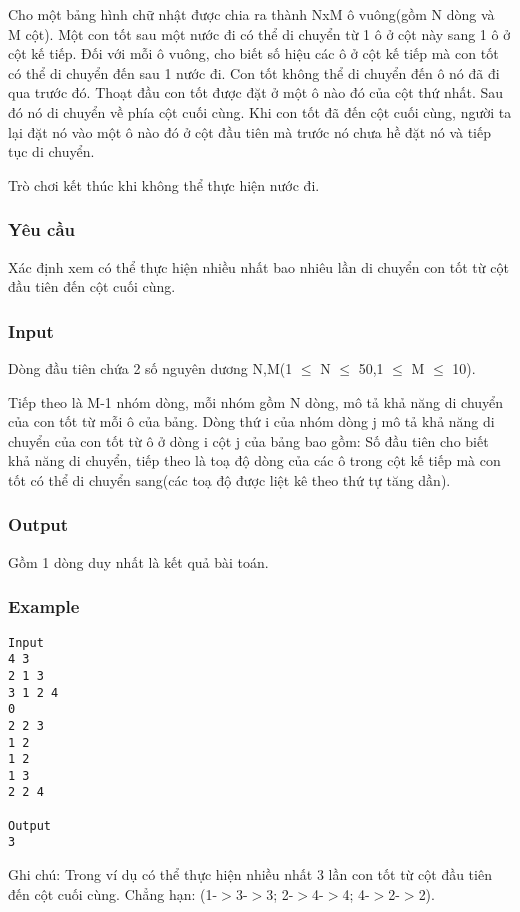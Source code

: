 



   Cho một bảng hình chữ nhật được chia ra thành NxM ô vuông(gồm N dòng và M cột). Một con tốt sau một nước đi có thể di chuyển từ 1 ô ở cột này sang 1 ô ở cột kế tiếp. Đối với mỗi ô vuông, cho biết số hiệu các ô ở cột kế tiếp mà con tốt có thể di chuyển đến sau 1 nước đi. Con tốt không thể di chuyển đến ô nó đã đi qua trước đó. Thoạt đầu con tốt được đặt ở một ô nào đó của cột thứ nhất. Sau đó nó di chuyển về phía cột cuối cùng. Khi con tốt đã đến cột cuối cùng, người ta lại đặt nó vào một ô nào đó ở cột đầu tiên mà trước nó chưa hề đặt nó và tiếp tục di chuyển.  

   Trò chơi kết thúc khi không thể thực hiện nước đi.  

\subsubsection{   Yêu cầu  }

   Xác định xem có thể thực hiện nhiều nhất bao nhiêu lần di chuyển con tốt từ cột đầu tiên đến cột cuối cùng.  

\subsubsection{   Input  }

   Dòng đầu tiên chứa 2 số nguyên dương N,M(1 $\le$ N $\le$ 50,1 $\le$ M $\le$ 10).  

   Tiếp theo là M-1 nhóm dòng, mỗi nhóm gồm N dòng, mô tả khả năng di chuyển của con tốt từ mỗi ô của bảng. Dòng thứ i của nhóm dòng j mô tả khả năng di chuyển của con tốt từ ô ở dòng i cột j của bảng bao gồm: Số đầu tiên cho biết khả năng di chuyển, tiếp theo là toạ độ dòng của các ô trong cột kế tiếp mà con tốt có thể di chuyển sang(các toạ độ được liệt kê theo thứ tự tăng dần).  

\subsubsection{   Output  }

   Gồm 1 dòng duy nhất là kết quả bài toán.  

\subsubsection{   Example  }
\begin{verbatim}
Input
4 3 
2 1 3 
3 1 2 4
0
2 2 3 
1 2 
1 2 
1 3 
2 2 4 

Output
3
\end{verbatim}

   Ghi chú: Trong ví dụ có thể thực hiện nhiều nhất 3 lần con tốt từ cột đầu tiên đến cột cuối cùng. Chẳng hạn: (1-$>$3-$>$3; 2-$>$4-$>$4; 4-$>$2-$>$2).  
